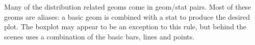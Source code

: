 % 


% 


Many of the distribution related geoms come in geom/stat pairs.  Most of these geoms are aliases: a basic geom is combined with a stat to produce the desired plot.  The boxplot may appear to be an exception to this rule, but behind the scenes  uses a combination of the basic bars, lines and points.

